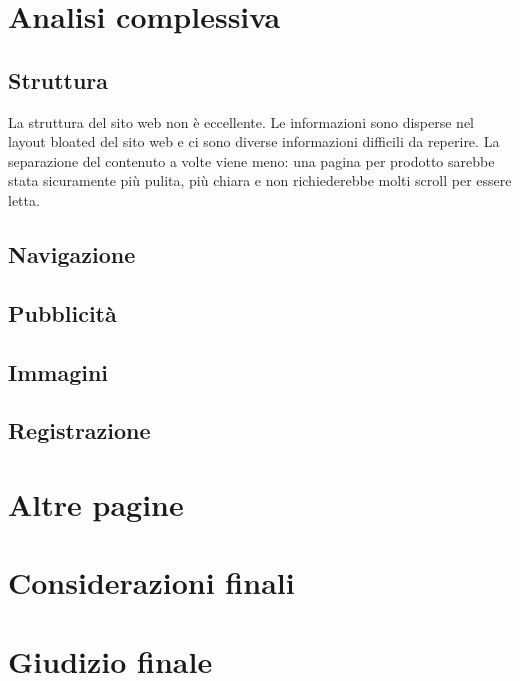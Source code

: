 \documentclass[11pt,a4paper]{article}
\begin{document}
\section{Analisi complessiva}
\label{sec:full-analysis}

\subsection{Struttura}
\label{subsec:structure}

La struttura del sito web non è eccellente. Le informazioni sono
disperse nel layout bloated del sito web e ci sono diverse
informazioni difficili da reperire. La separazione del contenuto a
volte viene meno: una pagina per prodotto sarebbe stata sicuramente
più pulita, più chiara e non richiederebbe molti scroll per essere
letta.

\subsection{Navigazione}
\label{subsec:navigation}

\subsection{Pubblicità}
\label{subsec:ads}

\subsection{Immagini}
\label{subsec:images}

\subsection{Registrazione}
\label{subsec:signup}

\section{Altre pagine}
\label{sec:other-pages}

\section{Considerazioni finali}
\label{sec:final-remarks}

\section{Giudizio finale}
\label{sec:final-vote}
\end{document}
